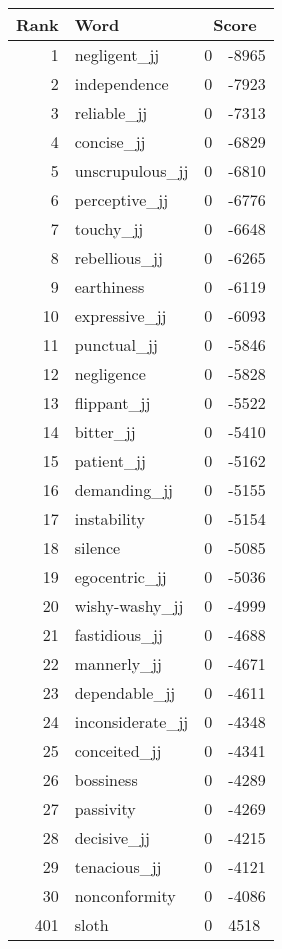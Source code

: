 \begin{longtable}[!htbp]{| rlr@{.}l |}
    \hline
    \textbf{Rank} & \textbf{Word} & \multicolumn{2}{c|}{\textbf{Score}} \\
    \hline
    \endhead
    1 & negligent\_jj & 0 & -8965 \\
    2 & independence & 0 & -7923 \\
    3 & reliable\_jj & 0 & -7313 \\
    4 & concise\_jj & 0 & -6829 \\
    5 & unscrupulous\_jj & 0 & -6810 \\
    6 & perceptive\_jj & 0 & -6776 \\
    7 & touchy\_jj & 0 & -6648 \\
    8 & rebellious\_jj & 0 & -6265 \\
    9 & earthiness & 0 & -6119 \\
    10 & expressive\_jj & 0 & -6093 \\
    11 & punctual\_jj & 0 & -5846 \\
    12 & negligence & 0 & -5828 \\
    13 & flippant\_jj & 0 & -5522 \\
    14 & bitter\_jj & 0 & -5410 \\
    15 & patient\_jj & 0 & -5162 \\
    16 & demanding\_jj & 0 & -5155 \\
    17 & instability & 0 & -5154 \\
    18 & silence & 0 & -5085 \\
    19 & egocentric\_jj & 0 & -5036 \\
    20 & wishy-washy\_jj & 0 & -4999 \\
    21 & fastidious\_jj & 0 & -4688 \\
    22 & mannerly\_jj & 0 & -4671 \\
    23 & dependable\_jj & 0 & -4611 \\
    24 & inconsiderate\_jj & 0 & -4348 \\
    25 & conceited\_jj & 0 & -4341 \\
    26 & bossiness & 0 & -4289 \\
    27 & passivity & 0 & -4269 \\
    28 & decisive\_jj & 0 & -4215 \\
    29 & tenacious\_jj & 0 & -4121 \\
    30 & nonconformity & 0 & -4086 \\
    401 & sloth & 0 & 4518 \\

\end{longtable}
